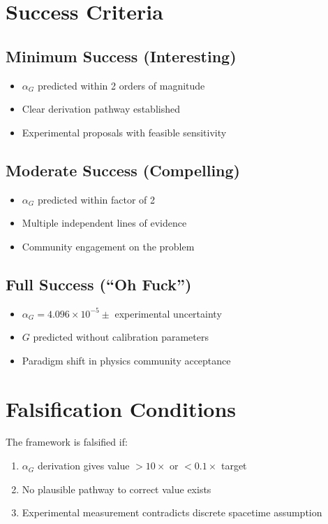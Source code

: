 \documentclass[11pt]{article}
\begin{document}
\section{Success Criteria}

\subsection{Minimum Success (Interesting)}
\begin{itemize}
\item $\alpha_G$ predicted within 2 orders of magnitude
\item Clear derivation pathway established
\item Experimental proposals with feasible sensitivity
\end{itemize}

\subsection{Moderate Success (Compelling)}
\begin{itemize}
\item $\alpha_G$ predicted within factor of 2
\item Multiple independent lines of evidence
\item Community engagement on the problem
\end{itemize}

\subsection{Full Success (``Oh Fuck'')}
\begin{itemize}
\item $\alpha_G = 4.096\times 10^{-5} \pm$ experimental uncertainty
\item $G$ predicted without calibration parameters
\item Paradigm shift in physics community acceptance
\end{itemize}

\section{Falsification Conditions}

The framework is falsified if:
\begin{enumerate}
\item $\alpha_G$ derivation gives value $>10\times$ or $<0.1\times$ target
\item No plausible pathway to correct value exists
\item Experimental measurement contradicts discrete spacetime assumption
\end{enumerate}
\end{document}

